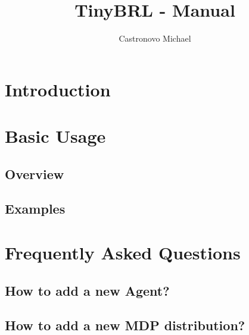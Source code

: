 \documentclass[10pt,a4paper]{article}
\title{TinyBRL - Manual}
\author{Castronovo Michael}
\date{}
\begin{document}
\maketitle
\tableofcontents

\section{Introduction}
\section{Basic Usage}
	\subsection{Overview}	
	\subsection{Examples}
	
\section{Frequently Asked Questions}
	\subsection{How to add a new Agent?}
	\subsection{How to add a new MDP distribution?}
\end{document}
